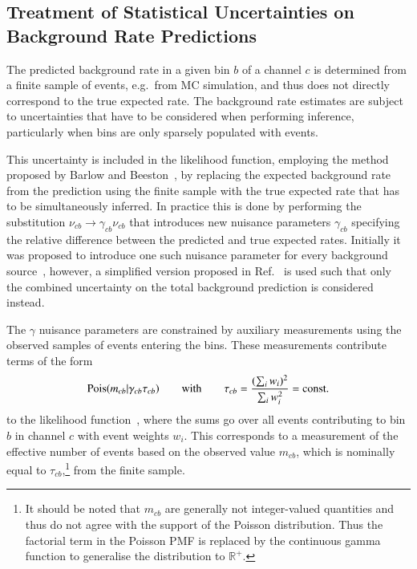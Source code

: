 \subsection{Treatment of Statistical Uncertainties on Background Rate
  Predictions}%
\label{sec:barlow_beeston}

The predicted background rate in a given bin $b$ of a channel $c$ is
determined from a finite sample of events, e.g.\ from MC simulation,
and thus does not directly correspond to the true expected rate. The
background rate estimates are subject to uncertainties that have to be
considered when performing inference, particularly when bins are only
sparsely populated with events.

This uncertainty is included in the likelihood function, employing the
method proposed by Barlow and Beeston~\cite{barlow1993}, by replacing
the expected background rate from the prediction using the finite
sample with the true expected rate that has to be simultaneously
inferred. In practice this is done by performing the substitution
$\nu_{cb} \rightarrow \gamma_{cb} \nu_{cb}$ that introduces new
nuisance parameters $\gamma_{cb}$ specifying the relative difference
between the predicted and true expected rates. Initially it was
proposed to introduce one such nuisance parameter for every background
source~\cite{barlow1993}, however, a simplified version proposed in
Ref.~\cite{conway2011} is used such that only the combined uncertainty
on the total background prediction is considered instead.

The $\gamma$ nuisance parameters are constrained by auxiliary
measurements using the observed samples of events entering the
bins. These measurements contribute terms of the form
\begin{align*}
  \operatorname{Pois}(m_{cb} | \gamma_{cb} \tau_{cb})
  \qquad \text{with} \qquad
  \tau_{cb} = \frac{( \sum_i w_i )^2}{\sum_i w_i^2} = \text{const.}
\end{align*}
to the likelihood function~\cite{cranmer2012}, where the sums go over
all events contributing to bin $b$ in channel $c$ with event weights
$w_i$. This corresponds to a measurement of the effective number of
events based on the observed value $m_{cb}$, which is nominally equal
to $\tau_{cb}$,\footnote{It should be noted that $m_{cb}$ are generally
  not integer-valued quantities and thus do not agree with the support
  of the Poisson distribution. Thus the factorial term in the Poisson
  PMF is replaced by the continuous gamma function to generalise the
  distribution to $\mathbb{R}^+$.} from the finite sample.

